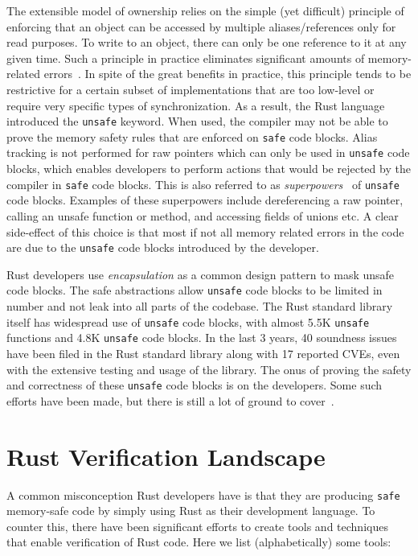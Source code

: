 \documentclass[runningheads]{llncs}
\begin{document}
The extensible model of ownership relies on the simple (yet difficult) principle of enforcing that an object can be accessed by multiple aliases/references only for read purposes. To write to an object, there can only be one reference to it at any given time. Such a principle in practice eliminates significant amounts of memory-related errors~\cite{rustAndroid}. In spite of the great benefits in practice, this principle tends to be restrictive for a certain subset of implementations that are too low-level or require very specific types of synchronization. As a result, the Rust language introduced the \texttt{unsafe} keyword. When used, the compiler may not be able to prove the memory safety rules that are enforced on \texttt{safe} code blocks. Alias tracking is not performed for raw pointers which can only be used in \texttt{unsafe} code blocks, which enables developers to perform actions that would be rejected by the compiler in \texttt{safe} code blocks. This is also referred to as \textit{superpowers}~\cite{superPower} of \texttt{unsafe} code blocks. Examples of these superpowers include dereferencing a raw pointer, calling an unsafe function or method, and accessing fields of unions etc. A clear side-effect of this choice is that most if not all memory related errors in the code are due to the \texttt{unsafe} code blocks introduced by the developer. 

Rust developers use \textit{encapsulation} as a common design pattern to mask unsafe code blocks. The safe abstractions allow \texttt{unsafe} code blocks to be limited in number and not leak into all parts of the codebase. The Rust standard library itself has widespread use of \texttt{unsafe} code blocks, with almost 5.5K \texttt{unsafe} functions and 4.8K \texttt{unsafe} code blocks. In the last 3 years, 40 soundness issues have been filed in the Rust standard library along with 17 reported CVEs, even with the extensive testing and usage of the library. The onus of proving the safety and correctness of these \texttt{unsafe} code blocks is on the developers. Some such efforts have been made, but there is still a lot of ground to cover~\cite{jung2017rustbelt}.

\section{Rust Verification Landscape}

A common misconception Rust developers have is that they are producing \texttt{safe} memory-safe code by simply using Rust as their development language. To counter this, there have been significant efforts to create tools and techniques that enable verification of Rust code. Here we list (alphabetically) some tools:
\end{document}
